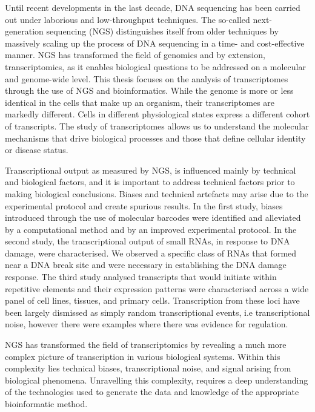 Until recent developments in the last decade, DNA sequencing has been carried out under laborious and low-throughput techniques. The so-called next-generation sequencing (NGS) distinguishes itself from older techniques by massively scaling up the process of DNA sequencing in a time- and cost-effective manner. NGS has transformed the field of genomics and by extension, transcriptomics, as it enables biological questions to be addressed on a molecular and genome-wide level. This thesis focuses on the analysis of transcriptomes through the use of NGS and bioinformatics. While the genome is more or less identical in the cells that make up an organism, their transcriptomes are markedly different. Cells in different physiological states express a different cohort of transcripts. The study of transcriptomes allows us to understand the molecular mechanisms that drive biological processes and those that define cellular identity or disease status.

Transcriptional output as measured by NGS, is influenced mainly by technical and biological factors, and it is important to address technical factors prior to making biological conclusions. Biases and technical artefacts may arise due to the experimental protocol and create spurious results. In the first study, biases introduced through the use of molecular barcodes were identified and alleviated by a computational method and by an improved experimental protocol. In the second study, the transcriptional output of small RNAs, in response to DNA damage, were characterised. We observed a specific class of RNAs that formed near a DNA break site and were necessary in establishing the DNA damage response. The third study analysed transcripts that would initiate within repetitive elements and their expression patterns were characterised across a wide panel of cell lines, tissues, and primary cells. Transcription from these loci have been largely dismissed as simply random transcriptional events, i.e transcriptional noise, however there were examples where there was evidence for regulation.

NGS has transformed the field of transcriptomics by revealing a much more complex picture of transcription in various biological systems. Within this complexity lies technical biases, transcriptional noise, and signal arising from biological phenomena. Unravelling this complexity, requires a deep understanding of the technologies used to generate the data and knowledge of the appropriate bioinformatic method.

